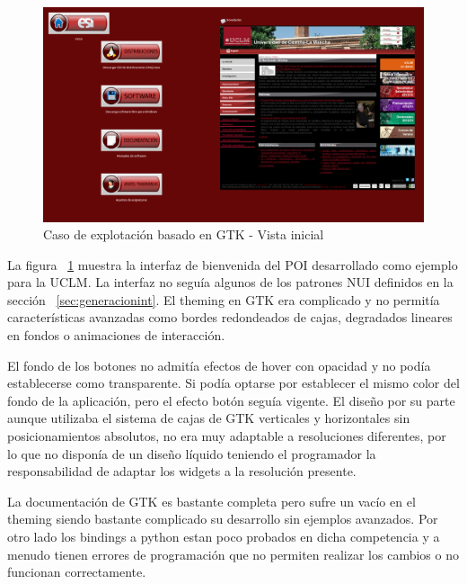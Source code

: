 \begin{figure}[ht]
    \begin{center}
        \includegraphics[width=425px]{src/img/freestation-demo1.png}
        \caption[Caso de explotación basado en GTK - Vista inicial]
          {Caso de explotación basado en GTK - Vista inicial}
          \label{fig:explotationgtkinit}
    \end{center}
\end{figure}

La figura ~\ref{fig:explotationgtkinit} muestra la interfaz de bienvenida del
POI desarrollado como ejemplo para la UCLM. La interfaz no seguía algunos de los
patrones NUI definidos en la sección ~\ref{sec:generacionint}. El theming en GTK
era complicado y no permitía características avanzadas como bordes redondeados 
de cajas, degradados lineares en fondos o animaciones de interacción.

El fondo de los botones no admitía efectos de hover con opacidad y no podía
establecerse como transparente. Si podía optarse por establecer el mismo color
del fondo de la aplicación, pero el efecto botón seguía vigente. El diseño por
su parte aunque utilizaba el sistema de cajas de GTK verticales y horizontales
sin posicionamientos absolutos, no era muy adaptable a resoluciones diferentes,
por lo que no disponía de un diseño líquido teniendo el programador la 
responsabilidad de adaptar los widgets a la resolución presente.

La documentación de GTK es bastante completa pero sufre un vacío en el theming
siendo bastante complicado su desarrollo sin ejemplos avanzados. Por otro lado
los bindings a python estan poco probados en dicha competencia y a menudo tienen
errores de programación que no permiten realizar los cambios o no funcionan
correctamente.

\newpage


